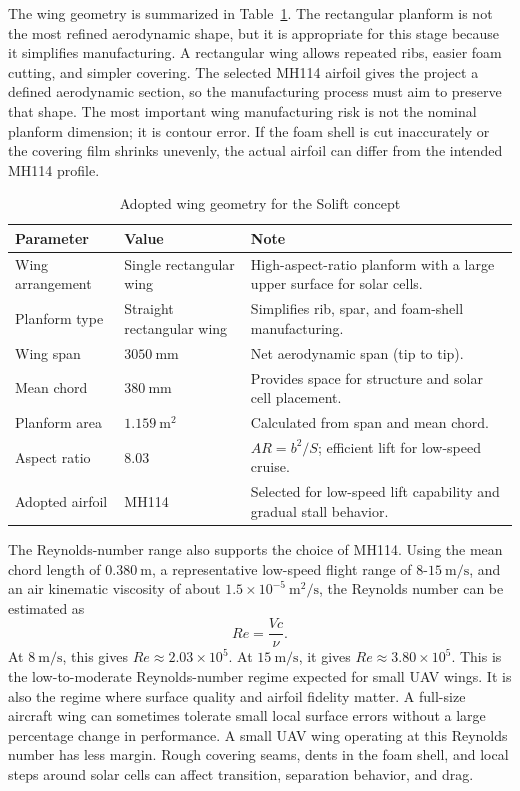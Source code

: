 The wing geometry is summarized in Table~\ref{tab:wing-geometry}. The rectangular planform is not the most refined aerodynamic shape, but it is appropriate for this stage because it simplifies manufacturing. A rectangular wing allows repeated ribs, easier foam cutting, and simpler covering. The selected MH114 airfoil gives the project a defined aerodynamic section, so the manufacturing process must aim to preserve that shape. The most important wing manufacturing risk is not the nominal planform dimension; it is contour error. If the foam shell is cut inaccurately or the covering film shrinks unevenly, the actual airfoil can differ from the intended MH114 profile.

\begin{table}[htbp]
    \centering
    \caption{Adopted wing geometry for the Solift concept}
    \label{tab:wing-geometry}
    \begin{tabular}{p{} p{} p{}}
        \toprule
        Parameter & Value & Note \\
        \midrule
        Wing arrangement &
        Single rectangular wing &
        High-aspect-ratio planform with a large upper surface for solar cells. \\
        Planform type &
        Straight rectangular wing &
        Simplifies rib, spar, and foam-shell manufacturing. \\
        Wing span &
        \(3050~\mathrm{mm}\) &
        Net aerodynamic span (tip to tip). \\
        Mean chord &
        \(380~\mathrm{mm}\) &
        Provides space for structure and solar cell placement. \\
        Planform area &
        \(1.159~\mathrm{m^2}\) &
        Calculated from span and mean chord. \\
        Aspect ratio &
        8.03 &
        \(AR=b^2/S\); efficient lift for low-speed cruise. \\
        Adopted airfoil &
        MH114 &
        Selected for low-speed lift capability and gradual stall behavior. \\
        \bottomrule
    \end{tabular}
\end{table}

The Reynolds-number range also supports the choice of MH114. Using the mean chord length of \(0.380~\mathrm{m}\), a representative low-speed flight range of \(8\)-\(15~\mathrm{m/s}\), and an air kinematic viscosity of about \(1.5 \times 10^{-5}~\mathrm{m^2/s}\), the Reynolds number can be estimated as
\[
    Re = \frac{Vc}{\nu}.
\]
At \(8~\mathrm{m/s}\), this gives \(Re \approx 2.03 \times 10^5\). At \(15~\mathrm{m/s}\), it gives \(Re \approx 3.80 \times 10^5\). This is the low-to-moderate Reynolds-number regime expected for small UAV wings. It is also the regime where surface quality and airfoil fidelity matter. A full-size aircraft wing can sometimes tolerate small local surface errors without a large percentage change in performance. A small UAV wing operating at this Reynolds number has less margin. Rough covering seams, dents in the foam shell, and local steps around solar cells can affect transition, separation behavior, and drag.

